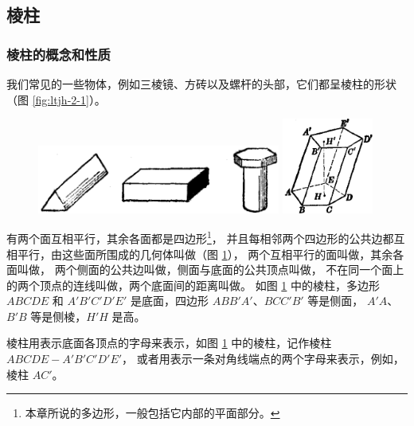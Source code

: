 \subsection{棱柱}\label{subsec:2-1}

\subsubsection{棱柱的概念和性质}

我们常见的一些物体，例如三棱镜、方砖以及螺杆的头部，它们都呈棱柱的形状（图 \ref{fig:ltjh-2-1}）。

\begin{figure}[htbp]
    \centering
    \begin{minipage}[b]{9cm}
        \centering
        \includegraphics[width=8cm]{../pic/ltjh-ch2-01.png}
        \caption{}\label{fig:ltjh-2-1}
    \end{minipage}
    \qquad
    \begin{minipage}[b]{5cm}
        \centering
        \includegraphics[width=3cm]{../pic/ltjh-ch2-02.png}
        \caption{}\label{fig:ltjh-2-2}
    \end{minipage}
\end{figure}

有两个面互相平行，其余各面都是四边形\footnote{本章所说的多边形，一般包括它内部的平面部分。}，
并且每相邻两个四边形的公共边都互相平行，由这些面所围成的几何体叫做（图 \ref{fig:ltjh-2-2}），
两个互相平行的面叫做，其余各面叫做，
两个侧面的公共边叫做，侧面与底面的公共顶点叫做，
不在同一个面上的两个顶点的连线叫做，两个底面间的距离叫做。
如图 \ref{fig:ltjh-2-2} 中的棱柱，多边形 $ABCDE$ 和 $A'B'C'D'E'$ 是底面，四边形 $ABB'A'$、$BCC'B'$ 等是侧面，
$A'A$、$B'B$ 等是侧棱，$H'H$ 是高。

棱柱用表示底面各顶点的字母来表示，如图 \ref{fig:ltjh-2-2} 中的棱柱，记作棱柱 $ABCDE{-}A'B'C'D'E'$，
或者用表示一条对角线端点的两个字母来表示，例如，棱柱 $AC'$。

